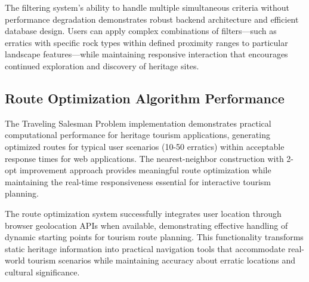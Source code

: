 
The filtering system's ability to handle multiple simultaneous criteria without performance degradation demonstrates robust backend architecture and efficient database design. Users can apply complex combinations of filters—such as erratics with specific rock types within defined proximity ranges to particular landscape features—while maintaining responsive interaction that encourages continued exploration and discovery of heritage sites.

\subsection{Route Optimization Algorithm Performance}
\label{subsec:route_optimization_performance}

The Traveling Salesman Problem implementation demonstrates practical computational performance for heritage tourism applications, generating optimized routes for typical user scenarios (10-50 erratics) within acceptable response times for web applications. The nearest-neighbor construction with 2-opt improvement approach provides meaningful route optimization while maintaining the real-time responsiveness essential for interactive tourism planning.


The route optimization system successfully integrates user location through browser geolocation APIs when available, demonstrating effective handling of dynamic starting points for tourism route planning. This functionality transforms static heritage information into practical navigation tools that accommodate real-world tourism scenarios while maintaining accuracy about erratic locations and cultural significance.

